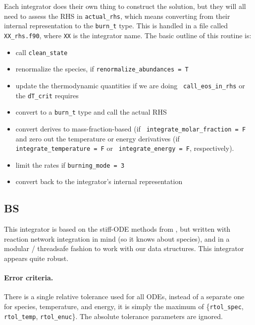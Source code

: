     
Each integrator does their own thing to construct the solution, 
but they will all need to assess the RHS in {\tt actual\_rhs},
which means converting from their internal representation
to the {\tt burn\_t} type.  This is handled in a file
called {\tt XX\_rhs.f90}, where {\tt XX} is the integrator name.
The basic outline of this routine is:
\begin{itemize}
\item call {\tt clean\_state}

\item renormalize the species, if {\tt renormalize\_abundances = T}

\item update the thermodynamic quantities if we are doing {\tt
  call\_eos\_in\_rhs} or the {\tt dT\_crit} requires

\item convert to a {\tt burn\_t} type and call the actual RHS

\item convert derives to mass-fraction-based (if {\tt
  integrate\_molar\_fraction = F} and zero out the temperature or
  energy derivatives (if {\tt integrate\_temperature = F} or {\tt
    integrate\_energy = F}, respectively).

\item limit the rates if {\tt burning\_mode = 3}

\item convert back to the integrator's internal representation
\end{itemize}


\subsection{BS}
\label{sec:BS}

This integrator is based on the stiff-ODE methods from \cite{NR}, but
written with reaction network integration in mind (so it knows about
species), and in a modular / threadsafe fashion to work with our data
structures.  This integrator appears quite robust.

\paragraph{Error criteria.}  There is a single relative tolerance used
for all ODEs, instead of a separate one for species, temperature, and
energy, it is simply the maximum of \{{\tt rtol\_spec}, {\tt
  rtol\_temp}, {\tt rtol\_enuc}\}.  The absolute tolerance parameters
are ignored.

